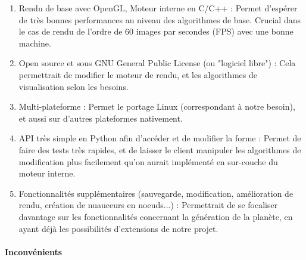 \documentclass[a4paper]{article}
\begin{document}
\begin{enumerate}
            \item {Rendu de base avec OpenGL, Moteur interne en C/C++ :}
            Permet d'espérer de très bonnes performances au niveau des algorithmes de base. Crucial dans le cas de rendu de l'ordre de 60 images par secondes (FPS) avec une bonne machine.
            
            \item {Open source et sous GNU General Public License (ou "logiciel libre") :}
            Cela permettrait de modifier le moteur de rendu, et les algorithmes de visualisation selon les besoins.
            
            \item {Multi-plateforme :}
            Permet le portage Linux (correspondant à notre besoin), et aussi sur d'autres plateformes nativement.
            
            \item {API très simple en Python afin d'accéder et de modifier la forme :}
            Permet de faire des tests très rapides, et de laisser le client manipuler les algorithmes de modification plus facilement qu'on aurait implémenté en sur-couche du moteur interne.
            
            \item {Fonctionnalités supplémentaires (sauvegarde, modification, amélioration de rendu, création de nuauceurs en noeuds...) :}
            Permettrait de se focaliser davantage sur les fonctionnalités concernant la génération de la planète, en ayant déjà les possibilités d'extensions de notre projet.
            
\end{enumerate}

\paragraph{Inconvénients}
\end{document}
